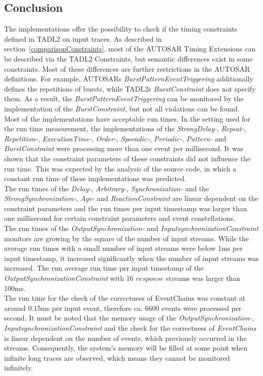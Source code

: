 \subsection{Conclusion}
	The implementations offer the possibility to check if the timing constraints defined in TADL2 on input traces. As described in section~\ref{comparisonConstraints}, most of the AUTOSAR Timing Extensions can be described via the TADL2 Constraints, but semantic differences exist in some constraints. Most of these differences are further restrictions in the AUTOSAR definitions. For example, AUTOSARs \textit{BurstPatternEventTriggering} additionally defines the repetitions of bursts, while TADL2s \textit{BurstConstraint} does not specify them. As a result, the \textit{BurstPatternEventTriggering} can be monitored by the implementation of the \textit{BurstConstraint}, but not all violations can be found.\\
	Most of the implementations have acceptable run times. In the setting used for the run time measurement, the implementations of the  \textit{StrongDelay-}, \textit{Repeat-}, \textit{Repetition-}, \textit{ExecutionTime-}, \textit{Order-}, \textit{Sporadic-}, \textit{Periodic-}, \textit{Pattern-} and \textit{BurstConstraint} were processing more than one event per millisecond. It was shown that the constraint parameters of these constraints did not influence the run time. This was expected by the analysis of the source code, in which a constant run time of these implementations was predicted.\\
	The run times of the \textit{Delay-}, \textit{Arbitrary-}, \textit{Synchronization-} and the \textit{StrongSynchronization-}, \textit{Age-} and \textit{ReactionConstraint} are linear dependent on the constraint parameters and the run times per input timestamp was larger than one millisecond for certain constraint parameters and event constellations.\\
	The run times of the \textit{OutputSynchronization-} and \textit{InputsynchronizationConstraint} monitors are growing by the square of the number of input streams. While the average run times with a small number of input streams were below 1ms per input timestamp, it increased significantly when the number of input streams was increased. The run average run time per input timestamp of the \textit{OutputSynchronizationConstraint} with 16 $response$ streams was larger than 100ms.\\
	The run time for the check of the correctness of EventChains was constant at around 0.15ms per input event, therefore ca. 6600 events were processed per second. It must be noted that the memory usage of the \textit{OutputSynchronization-}, \textit{InputsynchronizationConstraint} and the check for the correctness of \textit{EventChains} is linear dependent on the number of events, which previously occurred in the streams. Consequently, the system's memory will be filled at some point when infinite long traces are observed, which means they cannot be monitored infinitely.\\
	
